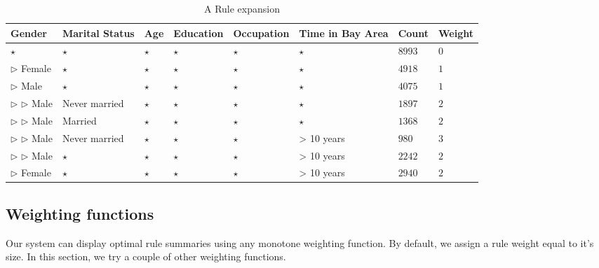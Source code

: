 \documentclass{sig-alternate}
\begin{document}
\begin{table} 
\centering 
\begin{tabular}{| p{1.5cm} | p{1.5cm} | p{1.5cm} | p{1.5cm} | p{1.5cm} | p{1.5cm} | l | l |} 
\hline Gender & Marital Status & Age & Education & Occupation & Time in Bay Area & Count & Weight \\ \hline 
\cline{1-8} $\star$ & $\star$ & $\star$ & $\star$ & $\star$ & $\star$ & $8993$ & $0$ \\
\cline{1-1} \cline{2-2} \cline{3-3} \cline{4-4} \cline{5-5} \cline{6-6} \cline{7-8} $\triangleright$ Female & $\star$ & $\star$ & $\star$ & $\star$ & $\star$ & $4918$ & $1$ \\
\cline{1-1} \cline{2-2} \cline{3-3} \cline{4-4} \cline{5-5} \cline{6-6} \cline{7-8} $\triangleright$ Male & $\star$ & $\star$ & $\star$ & $\star$ & $\star$ & $4075$ & $1$ \\
\cline{2-2} \cline{3-3} \cline{4-4} \cline{5-5} \cline{6-6} \cline{7-8} $\triangleright$ $\triangleright$ Male & Never married & $\star$ & $\star$ & $\star$ & $\star$ & $1897$ & $2$ \\
\cline{2-2} \cline{3-3} \cline{4-4} \cline{5-5} \cline{6-6} \cline{7-8} $\triangleright$ $\triangleright$ Male & Married & $\star$ & $\star$ & $\star$ & $\star$ & $1368$ & $2$ \\
\cline{2-2} \cline{3-3} \cline{4-4} \cline{5-5} \cline{6-6} \cline{7-8} $\triangleright$ $\triangleright$ Male & Never married & $\star$ & $\star$ & $\star$ & > 10 years & $980$ & $3$ \\
\cline{2-2} \cline{3-3} \cline{4-4} \cline{5-5} \cline{6-6} \cline{7-8} $\triangleright$ $\triangleright$ Male & $\star$ & $\star$ & $\star$ & $\star$ & > 10 years & $2242$ & $2$ \\
\cline{1-1} \cline{2-2} \cline{3-3} \cline{4-4} \cline{5-5} \cline{6-6} \cline{7-8} $\triangleright$ Female & $\star$ & $\star$ & $\star$ & $\star$ & > 10 years & $2940$ & $2$ \\
\hline 
\end{tabular} 
\caption{A Rule expansion \label{table:uiexamplerule}} 
\end{table} 

\subsection{Weighting functions}
Our system can display optimal rule summaries using any monotone weighting function. By default, we assign a rule weight equal to it's size. In this section, we try a couple of other weighting functions. 
\end{document}
